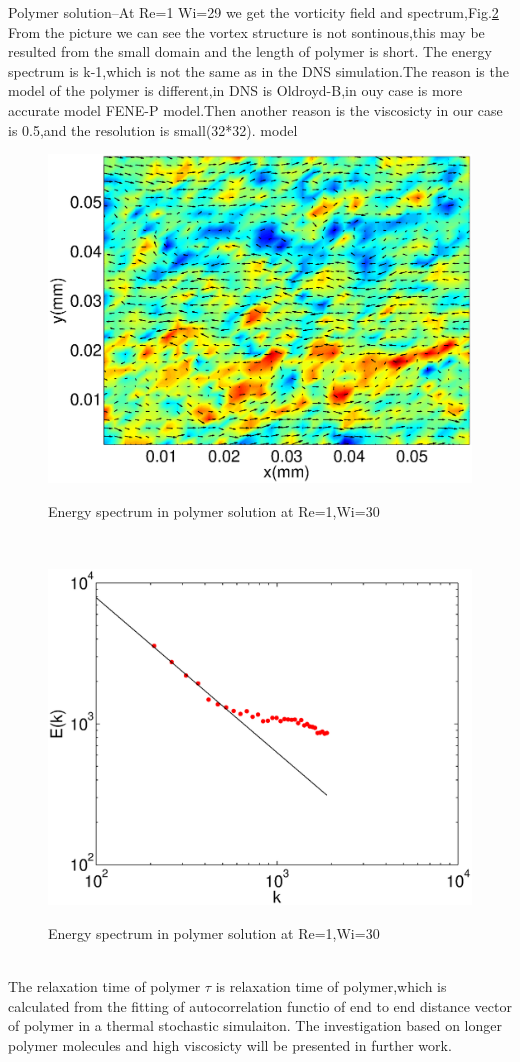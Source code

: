 \documentclass[aps,prl,twocolumn,showpacs,superscriptaddress,groupedaddress]{revtex4}  %
\begin{document}
Polymer solution--At Re=1 Wi=29 we get the vorticity field and spectrum,Fig.\ref{fig:spepols}
From the picture we can see the vortex structure is not sontinous,this may be resulted from the small domain and the length of polymer is short.
The energy spectrum is k-1,which is not the same as in the DNS simulation.The reason is the model of the polymer is different,in DNS is Oldroyd-B,in ouy case is more accurate model
FENE-P model.Then another reason is the viscosicty in our case is 0.5,and the resolution is small(32*32).
model
\begin{figure}
 \includegraphics[scale=0.35]{vorpols}
\label{fig:vorpols}
\caption{Energy spectrum in polymer solution at Re=1,Wi=30}
\end{figure}\\
\begin{figure}
 \includegraphics[scale=0.35]{spepols}
\label{fig:spepols}
\caption{Energy spectrum in polymer solution at Re=1,Wi=30}
\end{figure}\\
The relaxation time of polymer 
 $\tau$ is relaxation time of polymer,which is 
calculated from the fitting of autocorrelation functio of end to end distance vector of polymer in a thermal stochastic simulaiton.
The investigation based on longer polymer molecules and high viscosicty will be presented in further work.


\end{document}
